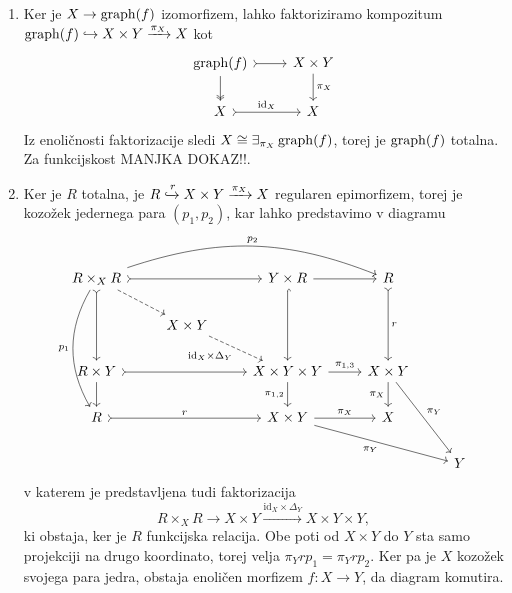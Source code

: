 \documentclass[../kategoricna_logika.tex]{subfiles}
\begin{document}
\begin{dokaz}
  \begin{enumerate}[label=(\roman*)]
  \item Ker je $X \to \operatorname{graph}(f)$ izomorfizem, lahko faktoriziramo
    kompozitum
    $\operatorname{graph}(f) \hookrightarrow X \times Y \xrightarrow{\pi_X} X$ kot
    \begin{equation*}
      \begin{tikzcd}
        \operatorname{graph}(f) \ar[d, two heads] \ar[r, tail]  & X \times Y \ar[d, "\pi_X"] \\
        X \ar[r, tail, "\mathrm{id}_X"] & X
      \end{tikzcd}
    \end{equation*}
    Iz enoličnosti faktorizacije sledi
    $X \cong \exists_{\pi_X}\operatorname{graph}(f)$, torej je $\operatorname{graph}(f)$ totalna.
    Za funkcijskost MANJKA DOKAZ!!.

  \item Ker je $R$ totalna, je
    $R \xhookrightarrow{r} X \times Y \xrightarrow{\pi_X} X$ regularen
    epimorfizem, torej je kozožek jedernega para $(p_1, p_2)$, kar
    lahko predstavimo v diagramu
    \begin{equation*}
      \begin{tikzcd}[column sep=normal]
        R \times_X R \ar[ddd, bend right=30, "p_1"'] \ar[dd, tail] \ar[dr, dashed] \ar[rr, tail]
        \ar[rrr, bend left=20, "p_2"] & &  Y \times R \ar[dd, hook] \ar[r] & R \ar[dd, tail, "r"] & \\
        & X \times Y \ar[dr, dashed, "\mathrm{id}_X \times \Delta_Y"'] & & & \\
        R \times Y \ar[d] \ar[rr, tail] & & X \times Y \times Y  \ar[d, "\pi_{1,2}"']
        \ar[r, "\pi_{1,3}"] & X\times Y \ar[d, "\pi_X"'] \ar[ddr, "\pi_Y"] & \\
        R \ar[rr, tail, "r"] & & X \times Y \ar[r, "\pi_X"] \ar[drr, "\pi_Y"'] & X & \\
        & & & & Y
      \end{tikzcd}
    \end{equation*}
    v katerem je predstavljena tudi faktorizacija
    $$R \times_X R \to X \times Y \xrightarrow{\mathrm{id}_X \times \Delta_Y} X \times Y \times Y,$$
    ki obstaja, ker je $R$ funkcijska relacija.  Obe poti od
    $X \times Y$ do $Y$ sta samo projekciji na drugo koordinato, torej
    velja $\pi_Y r p_1 = \pi_Y r p_2$.  Ker pa je $X$ kozožek svojega
    para jedra, obstaja enoličen morfizem $f : X \to Y$, da diagram
    komutira.


\end{enumerate}
\end{dokaz}
\end{document}
